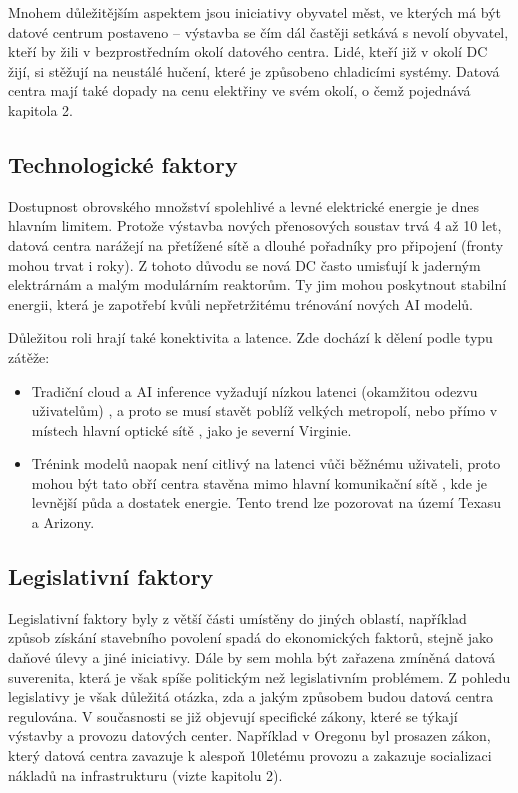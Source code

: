 Mnohem důležitějším aspektem jsou iniciativy obyvatel měst, ve kterých má být datové centrum postaveno -- výstavba se čím dál častěji setkává s nevolí obyvatel, kteří by žili v bezprostředním okolí datového centra. Lidé, kteří již v okolí DC žijí, si stěžují na neustálé hučení, které je způsobeno chladicími systémy. Datová centra mají také dopady na cenu elektřiny ve svém okolí, o čemž pojednává kapitola 2.

\subsection{Technologické faktory}
\label{subsec:pestle_te}

Dostupnost obrovského množství spolehlivé a levné elektrické energie je dnes hlavním limitem. Protože výstavba nových přenosových soustav trvá 4 až 10 let, datová centra narážejí na přetížené sítě a dlouhé pořadníky pro připojení (fronty mohou trvat i roky). \cite{ginzburg-ganz_technical_2025, iea_energy_2025} Z tohoto důvodu se nová DC často umisťují k jaderným elektrárnám a malým modulárním reaktorům. Ty jim mohou poskytnout stabilní energii, která je zapotřebí kvůli nepřetržitému trénování nových AI modelů. \cite{chen_electricity_2025, cruzes_data_2025}

Důležitou roli hrají také konektivita a latence. Zde dochází k dělení podle typu zátěže: 

\begin{itemize}
    \item Tradiční cloud a AI inference vyžadují nízkou latenci (okamžitou odezvu uživatelům) \cite[s. 33]{iea_energy_2025}, a proto se musí stavět poblíž velkých metropolí, nebo přímo v místech hlavní optické sítě \cite{pilz_compute_2023}, jako je severní Virginie. 
    \item Trénink modelů naopak není citlivý na latenci vůči běžnému uživateli, proto mohou být tato obří centra stavěna mimo hlavní komunikační sítě \cite{iea_energy_2025}, kde je levnější půda a dostatek energie. Tento trend lze pozorovat na území Texasu a Arizony.
\end{itemize}

\subsection{Legislativní faktory}
\label{subsec:pestle_le}

Legislativní faktory byly z větší části umístěny do jiných oblastí, například způsob získání stavebního povolení spadá do ekonomických faktorů, stejně jako daňové úlevy a jiné iniciativy. Dále by sem mohla být zařazena zmíněná datová suverenita, která je však spíše politickým než legislativním problémem. Z pohledu legislativy je však důležitá otázka, zda a jakým způsobem budou datová centra regulována. V současnosti se již objevují specifické zákony, které se týkají výstavby a provozu datových center. Například v Oregonu byl prosazen zákon, který datová centra zavazuje k alespoň 10letému provozu a zakazuje socializaci nákladů na infrastrukturu (vizte kapitolu 2). \cite[s. 19]{ginzburg-ganz_technical_2025}

